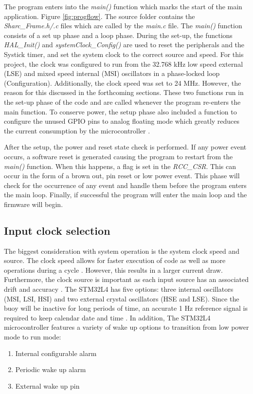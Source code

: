 The program enters into the \textit{main()} function which marks the start of the main application. Figure \ref{fig:progflow}. The source folder contains the \textit{Sharc\_Frame.h/.c }files which are called by the \textit{main.c} file. The \textit{main()} function consists of a set up phase and a loop phase. During the set-up, the functions \textit{HAL\_Init() }and \textit{systemClock\_Config()} are used to reset the peripherals and the Systick timer, and set the system clock to the correct source and speed. For this project, the clock was configured to run from the 32.768 kHz low speed external (LSE) and mixed speed internal (MSI) oscillators in a phase-locked loop (Configuration). Additionally, the clock speed was set to 24 MHz. However, the reason for this discussed in the forthcoming sections. These two functions run in the set-up phase of the code and are called whenever the program re-enters the main function. To conserve power, the setup phase also included a function to configure the unused GPIO pins to analog floating mode which greatly reduces the current consumption by the microcontroller \cite{stm32l4}. \par


After the setup, the power and reset state check is performed. If any power event occurs, a software reset is generated causing the program to restart from the \textit{main()} function. When this happens, a flag is set in the \textit{RCC\_CSR}. This can occur in the form of a brown out, pin reset or low power event. This phase will check for the occurrence of any event and handle them before the program enters the main loop. Finally, if successful the program will enter the main loop and the firmware will begin. 

\subsection{Input clock selection}

The biggest consideration with system operation is the system clock speed and source. The clock speed allows for faster execution of code as well as more operations during a cycle \cite{stm32l4}. However, this results in a larger current draw. Furthermore, the clock source is important as each input source has an associated drift and accuracy \cite{stm32l4ref}. The STM32L4 has five options: three internal oscillators (MSI, LSI, HSI) and two external crystal oscillators (HSE and LSE). Since the buoy will be inactive for long periods of time, an accurate 1 Hz reference signal is required to keep calendar date and time \cite{stm32l4ref}. In addition, The STM32L4 microcontroller features a variety of wake up options to transition from low power mode to run mode:
\begin{enumerate}
	\item Internal configurable alarm
	\item Periodic wake up alarm
	\item External wake up pin
\end{enumerate}


